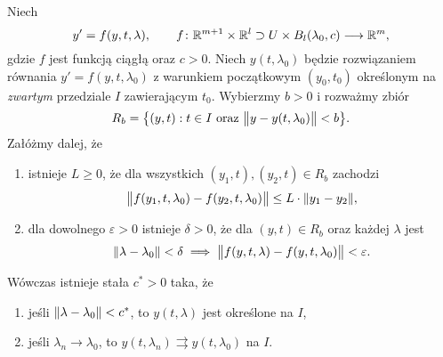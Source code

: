 %
\begin{theorem}
  Niech
%
  \begin{equation*}
    y' = f(y,t,\lambda), \qquad f \colon \R^{m+1} \times \R^l \supset U \times B_l(\lambda_0,c) \longrightarrow \R^m,
  \end{equation*}
%
  gdzie $f$ jest funkcją ciągłą oraz $c>0$. Niech $y(t,\lambda_0)$ będzie rozwiązaniem równania $y' = f(y,t,\lambda_0)$ 
  z warunkiem początkowym $(y_0,t_0)$ określonym na \emph{zwartym} przedziale $I$ zawierającym $t_0$. Wybierzmy $b > 0$ 
  i rozważmy zbiór
%
  \begin{equation*}
    R_b = \big\{ (y,t) : t \in I \text{ oraz } \norm[\big]{ y - y(t,\lambda_0) } < b \big\}.
  \end{equation*}
%
  Załóżmy dalej, że
%
  \begin{enumerate}[label=\alph*)]
    \item istnieje $L \geq 0$, że dla wszystkich $(y_1,t),(y_2,t) \in R_b$ zachodzi
%
    \begin{equation*}
      \norm[\big]{ f(y_1,t,\lambda_0) - f(y_2,t,\lambda_0) } \leq L \cdot \norm{y_1-y_2},
    \end{equation*}
%
    \item dla dowolnego $\varepsilon>0$ istnieje $\delta>0$, że dla $(y,t) \in R_b$ oraz każdej $\lambda$ jest
%
    \begin{equation*}
      \norm{\lambda - \lambda_0} < \delta \implies \norm[\big]{ f(y,t,\lambda) - f(y,t,\lambda_0) } < \varepsilon.
    \end{equation*}
%
  \end{enumerate}
%
  Wówczas istnieje stała $c^{\ast} > 0$ taka, że
%
  \begin{enumerate}
    \item jeśli $\norm{\lambda-\lambda_0} < c^{\ast}$, to $y(t,\lambda)$ jest określone na $I$,
    \item jeśli $\lambda_n \to \lambda_0$, to $y(t,\lambda_n) \rightrightarrows y(t,\lambda_0)$ na $I$.
  \end{enumerate}
%
\end{theorem}
%
